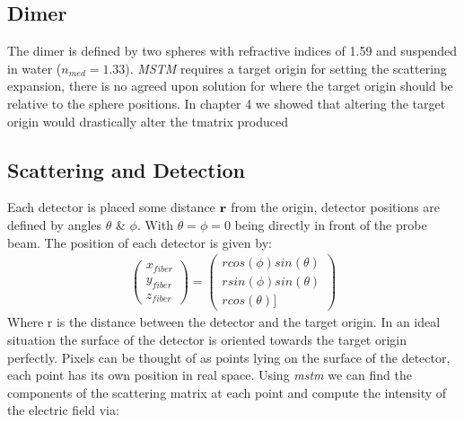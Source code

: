 \subsection{Dimer}
The dimer is defined by two spheres with refractive indices
of 1.59 and suspended in water ($n_{med} = 1.33$). \textit{MSTM}
requires a target origin for setting the scattering expansion, 
there is no agreed upon solution for where the target origin 
should be relative to the sphere positions. In chapter 4 we showed
that altering the target origin would drastically alter the 
tmatrix produced  

\subsection{Scattering and Detection}
Each detector is placed some distance $\bf r$ from the origin, 
detector positions are defined by angles $\theta$ \& $\phi$. With 
$\theta=\phi=0$ being directly in front of the probe beam. The 
position of each detector is given by:
\begin{align}
	\begin{pmatrix}
		x_{fiber} \\ y_{fiber} \\ z_{fiber}
	\end{pmatrix} = 
	\begin{pmatrix}
		rcos(\phi)sin(\theta) \\ rsin(\phi)sin(\theta) \\ rcos(\theta)]
	\end{pmatrix}
\end{align}
Where r is the distance between the detector and the target origin. 
In an ideal situation the surface of the detector is oriented towards 
the target origin perfectly. Pixels can be thought of as points lying 
on the surface of the detector, each point has its own position in real
space. Using \textit{mstm} we can find the components of the scattering 
matrix at each point and compute the intensity of the electric field via:

